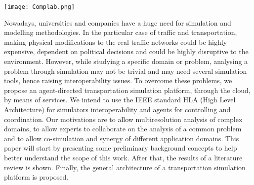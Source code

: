 \documentclass[a0paper,fontscale=0.4125,landscape]{baposter} %
\begin{document}
\begin{poster}
{{\begin{minipage}{16em}
            \texttt{[image: Complab.png]} \\
		\end{minipage}
	}
}
 {Nowadays, universities and companies have a huge need for simulation and modelling methodologies. In the particular case of traffic and transportation, making physical modifications to the real traffic networks could be highly expensive, dependent on political decisions and could be highly disruptive to the environment.
However, while studying a specific domain or problem, analysing a problem through simulation may not be trivial and may need several simulation tools, hence raising interoperability issues.
To overcome these problems, we propose an agent-directed transportation simulation platform, through the cloud, by means of services. We intend to use the IEEE standard HLA (High Level Architecture) for simulators interoperability and agents for controlling and coordination. Our motivations are to allow multiresolution analysis of complex domains, to allow experts to collaborate on the analysis of a common problem and to allow co-simulation and synergy of different application domains.
This paper will start by presenting some preliminary background concepts to help better understand the scope of this work. After that, the results of a literature review is shown. Finally, the general architecture of a transportation simulation platform is proposed.

}


\end{poster}
\end{document}
